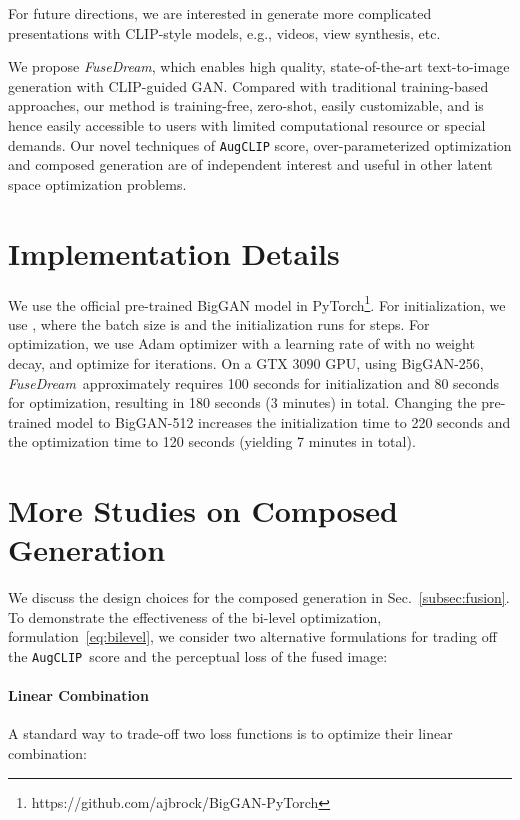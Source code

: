 \documentclass[10pt,twocolumn,letterpaper]{article}
\newcommand{\our}{\emph{FuseDream}}
\newcommand{\ourloss}{\texttt{AugCLIP}}
\begin{document}
For future directions, 
we are interested in generate more complicated presentations with CLIP-style models, e.g., videos, view synthesis, etc.
\fi

We propose {\our}, which enables high quality, state-of-the-art text-to-image generation with CLIP-guided GAN. 
Compared with traditional training-based approaches, 
our method is training-free, zero-shot, easily customizable, and is hence 
easily accessible to users with limited computational resource or special demands. 
Our novel techniques of {\ourloss} score, over-parameterized optimization and composed generation are of independent interest and useful in other latent space optimization problems.  


\newpage
{\small


}

\clearpage
\appendix
\onecolumn
\section{Implementation Details}
We use the official pre-trained BigGAN model in PyTorch\footnote{https://github.com/ajbrock/BigGAN-PyTorch}. For initialization, we use , where the batch size is  and the initialization runs for  steps. For optimization, we use Adam optimizer with a learning rate of  with no weight decay, and optimize for  iterations. On a GTX 3090 GPU, using BigGAN-256, \our~approximately requires 100 seconds for initialization and 80 seconds for optimization, resulting in 180 seconds (3 minutes) in total. Changing the pre-trained model to BigGAN-512  increases the initialization time to 220 seconds and the optimization time to 120 seconds (yielding 7 minutes in total). 

\section{More Studies on Composed Generation}
We discuss the design choices for the composed generation in Sec.~\ref{subsec:fusion}. 
To demonstrate the effectiveness of the bi-level optimization,  formulation~\eqref{eq:bilevel}, 
we consider 
two alternative formulations
for trading off the \ourloss~score  and the perceptual loss   of the fused image:  \vspace{.5\baselineskip}


\paragraph{Linear Combination} 
A standard way to trade-off two loss functions is to optimize their linear combination: 
\end{document}
